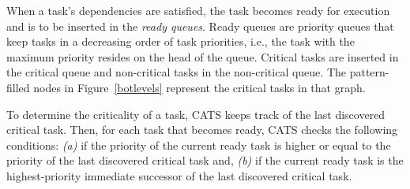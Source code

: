 When a task's dependencies are satisfied, the task becomes ready for execution and is to be inserted in the \textit{ready queues}. Ready queues are priority queues that keep tasks in a decreasing order of task priorities, i.e., the task with the maximum priority resides on the head of the queue. Critical tasks are inserted in the critical queue and non-critical tasks in the non-critical queue. The pattern-filled nodes in Figure~\ref{botlevels} represent the critical tasks in that graph. 


To determine the criticality of a task, CATS keeps track of the last discovered critical task. Then, for each task that becomes ready, CATS checks the following conditions:
\textit{(a)} if the priority of the current ready task is higher or equal to the priority of the last discovered critical task and, \textit{(b)} if the current ready task is the highest-priority immediate successor of the last discovered critical task.

